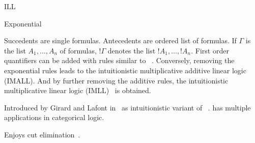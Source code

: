 \begin{entry}{ILL}
\begin{calculus}
\begin{infruleset}{Exponential}
  \sepproof
  \sepproof
  \sepproof
\end{infruleset}

\vspace{-1em}


\end{calculus}

\begin{clarifications}
  Succedents are single formulas.
  Antecedents are ordered list of formulas.
  If $\Gamma$ is the list $A_1, \ldots, A_n$ of formulas, $!\Gamma$ denotes the list $!A_1, \ldots, !A_n$.
  First order quantifiers can be added with rules similar to \LJ~.
  Conversely, removing the exponential rules leads to the intuitionistic multiplicative additive linear logic (IMALL).
  And by further removing the additive rules, the intuitionistic multiplicative linear logic (IMLL)~\cite{mints1977closed} is obtained.
\end{clarifications}

\begin{history}
  Introduced by Girard and Lafont in~\cite{lafont1987tapsoft} as intuitionistic variant of \LL~.
  \ILL has multiple applications in categorical logic.
\end{history}

\begin{technicalities}
  Enjoys cut elimination~\cite{lafont1987tapsoft}.
\end{technicalities}


\end{entry}
